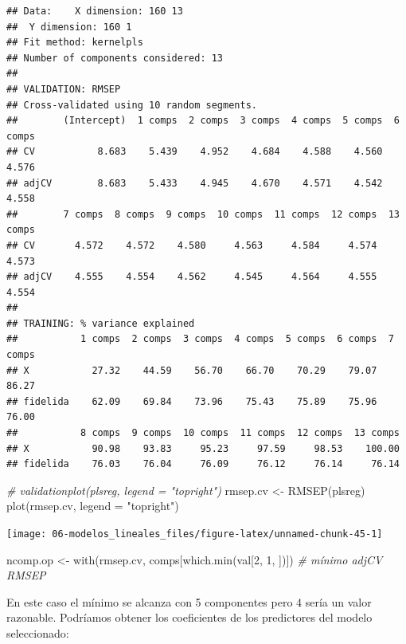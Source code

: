 \documentclass[
  spanish,
]{book}
\newenvironment{Shaded}{\begin{snugshade}}{\end{snugshade}}
\newcommand{\AttributeTok}[1]{\textcolor[rgb]{0.77,0.63,0.00}{#1}}
\newcommand{\CommentTok}[1]{\textcolor[rgb]{0.56,0.35,0.01}{\textit{#1}}}
\newcommand{\DecValTok}[1]{\textcolor[rgb]{0.00,0.00,0.81}{#1}}
\newcommand{\FunctionTok}[1]{\textcolor[rgb]{0.00,0.00,0.00}{#1}}
\newcommand{\NormalTok}[1]{#1}
\newcommand{\OtherTok}[1]{\textcolor[rgb]{0.56,0.35,0.01}{#1}}
\newcommand{\StringTok}[1]{\textcolor[rgb]{0.31,0.60,0.02}{#1}}
\theoremstyle{break}
\theoremstyle{definition}
\theoremstyle{definition}
\theoremstyle{definition}
\theoremstyle{definition}
\theoremstyle{remark}
\begin{document}
\begin{verbatim}
## Data:    X dimension: 160 13 
##  Y dimension: 160 1
## Fit method: kernelpls
## Number of components considered: 13
## 
## VALIDATION: RMSEP
## Cross-validated using 10 random segments.
##        (Intercept)  1 comps  2 comps  3 comps  4 comps  5 comps  6 comps
## CV           8.683    5.439    4.952    4.684    4.588    4.560    4.576
## adjCV        8.683    5.433    4.945    4.670    4.571    4.542    4.558
##        7 comps  8 comps  9 comps  10 comps  11 comps  12 comps  13 comps
## CV       4.572    4.572    4.580     4.563     4.584     4.574     4.573
## adjCV    4.555    4.554    4.562     4.545     4.564     4.555     4.554
## 
## TRAINING: % variance explained
##           1 comps  2 comps  3 comps  4 comps  5 comps  6 comps  7 comps
## X           27.32    44.59    56.70    66.70    70.29    79.07    86.27
## fidelida    62.09    69.84    73.96    75.43    75.89    75.96    76.00
##           8 comps  9 comps  10 comps  11 comps  12 comps  13 comps
## X           90.98    93.83     95.23     97.59     98.53    100.00
## fidelida    76.03    76.04     76.09     76.12     76.14     76.14
\end{verbatim}

\begin{Shaded}
\begin{Highlighting}[]
\CommentTok{\# validationplot(plsreg, legend = "topright")}
\NormalTok{rmsep.cv }\OtherTok{\textless{}{-}} \FunctionTok{RMSEP}\NormalTok{(plsreg)}
\FunctionTok{plot}\NormalTok{(rmsep.cv, }\AttributeTok{legend =} \StringTok{"topright"}\NormalTok{)}
\end{Highlighting}
\end{Shaded}

\begin{center}\texttt{[image: 06-modelos\_lineales\_files/figure-latex/unnamed-chunk-45-1]} \end{center}

\begin{Shaded}
\begin{Highlighting}[]
\NormalTok{ncomp.op }\OtherTok{\textless{}{-}} \FunctionTok{with}\NormalTok{(rmsep.cv, comps[}\FunctionTok{which.min}\NormalTok{(val[}\DecValTok{2}\NormalTok{, }\DecValTok{1}\NormalTok{, ])]) }\CommentTok{\# mínimo adjCV RMSEP}
\end{Highlighting}
\end{Shaded}

En este caso el mínimo se alcanza con 5 componentes pero 4 sería un valor razonable.
Podríamos obtener los coeficientes de los predictores del modelo seleccionado:
\end{document}
